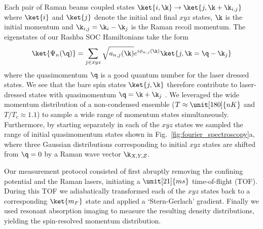 Each pair of Raman beams coupled states $\ket{i, \k}\rightarrow \ket{j, \k+\k_{i,j}}$ where $\ket{i}$ and $\ket{j}$ denote the initial and final $xyz$ states, $\k$ is the initial momentum and $\k_{i,j}=\k_i-\k_j$ is the Raman recoil momentum. The eigenstates of our Rashba SOC Hamiltonians take the form
\begin{equation}
	\ket{\Psi_n(\q)}=\sum_{j\in xyz}\sqrt{a_{n,j}(\k)}e^{i\phi_{n,j}(\k)}\ket{j,\k=\q-\k_{j}}	
	\label{Eq:Raman_wavefunction}
\end{equation}
where the quasimomentum $\q$ is a good quantum number for the laser dressed states. We see that the bare spin states $\ket{j,\k}$ therefore contribute to laser-dressed states with quasimomentum $\q=\k+\k_j$ . We leveraged the wide momentum distribution of a non-condensed ensemble ($T\approx\unit[180]{nK}$ and $T/T_c\approx 1.1$) to sample a wide range of momentum states simultaneously. Furthermore, by starting separately in each of the $xyz$ states we sampled the range of initial quasimomentum states shown in Fig.~\ref{fig:fourier_spectroscopy}a, where three Gaussian distributions corresponding to initial $xyz$ states are shifted from $\q=0$ by a Raman wave vector $\k_{X,Y,Z}$. 

Our measurement protocol consisted of first abruptly removing the confining potential and the Raman lasers, initiating a $\unit[21]{ms}$ time-of-flight (TOF). During this TOF we adiabatically transformed each of the $xyz$ states back to a corresponding $\ket{m_F}$ state and applied a `Stern-Gerlach' gradient. Finally we used resonant absorption imaging to measure the resulting density distributions, yielding the spin-resolved momentum distribution.

